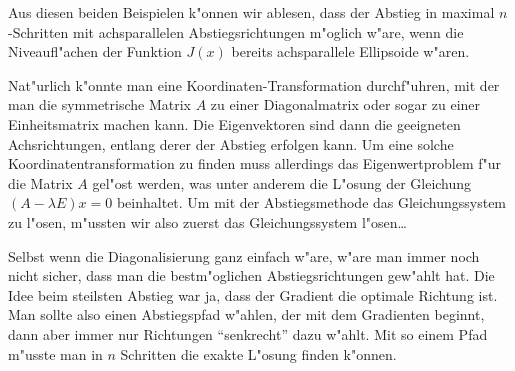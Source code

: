 Aus diesen beiden Beispielen k"onnen wir ablesen, dass der Abstieg in
maximal $n$-Schritten mit achsparallelen Abstiegsrichtungen
m"oglich w"are, wenn die Niveaufl"achen der Funktion $J(x)$ bereits
achsparallele Ellipsoide w"aren.

Nat"urlich k"onnte man eine Koordinaten-Transformation durchf"uhren,
mit der man die symmetrische Matrix $A$ zu einer Diagonalmatrix oder
sogar zu einer Einheitsmatrix machen kann.
Die Eigenvektoren sind dann die geeigneten Achsrichtungen, entlang derer
der Abstieg erfolgen kann.
Um eine solche Koordinatentransformation zu finden muss allerdings das
Eigenwertproblem f"ur die Matrix $A$ gel"ost werden, was unter anderem
die L"osung der Gleichung $(A-\lambda E)x=0$ beinhaltet. Um mit der
Abstiegsmethode das Gleichungssystem zu l"osen, m"ussten wir also zuerst
das Gleichungssystem l"osen\dots

Selbst wenn die Diagonalisierung ganz einfach w"are, w"are man immer noch nicht
sicher, dass man die bestm"oglichen Abstiegsrichtungen gew"ahlt hat.
Die Idee beim steilsten Abstieg war ja, dass der Gradient die optimale
Richtung ist. Man sollte also einen Abstiegspfad w"ahlen, der mit
dem Gradienten beginnt, dann aber immer nur Richtungen ``senkrecht'' dazu
w"ahlt. Mit so einem Pfad m"usste man in $n$ Schritten die exakte L"osung
finden k"onnen.

